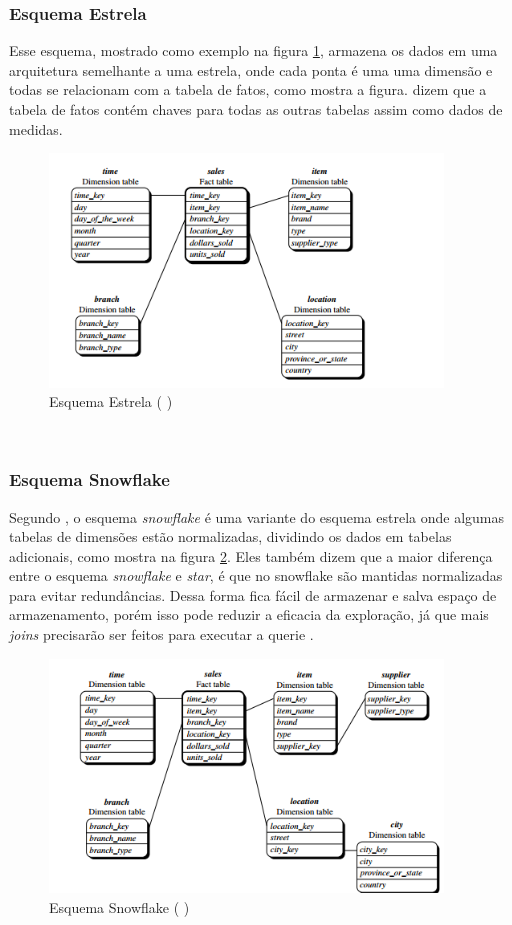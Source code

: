 \subsubsection{Esquema Estrela}
Esse esquema, mostrado como exemplo na figura \ref{star}, armazena os dados em uma arquitetura semelhante a uma estrela, onde cada ponta é uma uma dimensão e todas se relacionam com a tabela de fatos, como mostra a figura.  dizem que a tabela de fatos contém chaves para todas as outras tabelas assim como dados de medidas.
\begin{figure}[ht]
\centering
\includegraphics[height=6.2cm]{imagens/starscheme.png}
\caption{Esquema Estrela (\citeauthor{jmj} \citeyear{jmj})}
\label{star}
\end{figure}
\\
\subsubsection{Esquema Snowflake}
Segundo \citeauthor{jmj} \citeyear{jmj}, o esquema \textit{snowflake} é uma variante do esquema estrela onde algumas tabelas de dimensões estão normalizadas, dividindo os dados em tabelas adicionais, como mostra na figura \ref{snowflake}. Eles também dizem que a maior diferença entre o esquema \textit{snowflake} e \textit{star}, é que no snowflake são mantidas normalizadas para evitar redundâncias. Dessa forma fica fácil de armazenar e salva espaço de armazenamento, porém isso pode reduzir a eficacia da exploração, já que mais \textit{joins} precisarão ser feitos para executar a querie \citep{jmj}.
\begin{figure}[ht]
\centering
\includegraphics[height=6.2cm]{imagens/snowflakescheme.png}
\caption{Esquema Snowflake (\citeauthor{jmj} \citeyear{jmj})}
\label{snowflake}
\end{figure}
